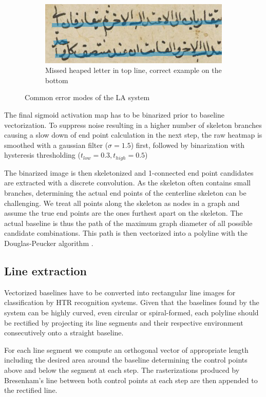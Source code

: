 \begin{figure}[ht!]
\begin{subfigure}[b]{\columnwidth}
		\includegraphics[width=\textwidth]{fail_heap.jpg}
		\caption{Missed heaped letter in top line, correct example on the bottom}
		\label{fig:misheap}
	\end{subfigure}
	\caption{Common error modes of the LA system}
\end{figure}

The final sigmoid activation map has to be binarized prior to baseline
vectorization. To suppress noise resulting in a higher number of skeleton
branches causing a slow down of end point calculation in the next step, the raw
heatmap is smoothed with a gaussian filter ($\sigma = 1.5$) first, followed by
binarization with hysteresis thresholding ($t_{low} = 0.3, t_{high} = 0.5$)

The binarized image is then skeletonized \cite{lee1994building} and 1-connected
end point candidates are extracted with a discrete convolution. As the skeleton
often contains small branches, determining the actual end points of the
centerline skeleton can be challenging. We treat all points along the skeleton
as nodes in a graph and assume the true end points are the ones furthest apart
on the skeleton. The actual baseline is thus the path of the maximum graph
diameter of all possible candidate combinations. This path is then vectorized
into a polyline with the Douglas-Peucker algorithm
\cite{douglas1973algorithms}.

\subsection{Line extraction}

Vectorized baselines have to be converted into rectangular line images for
classification by HTR recognition systems. Given that the baselines found by
the system can be highly curved, even circular or spiral-formed, each polyline
should be rectified by projecting its line segments and their respective
environment consecutively onto a straight baseline.

For each line segment we compute an orthogonal vector of appropriate length
including the desired area around the baseline determining the control points
above and below the segment at each step. The rasterizations produced by
Bresenham's line between both control points at each step are then appended to
the rectified line.

